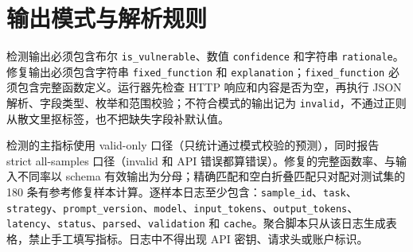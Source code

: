 \documentclass[conference]{IEEEtran}
\begin{document}
\section{输出模式与解析规则}
\label{app:schema}
检测输出必须包含布尔 \texttt{is\_vulnerable}、数值 \texttt{confidence} 和字符串 \texttt{rationale}。修复输出必须包含字符串 \texttt{fixed\_function} 和 \texttt{explanation}；\texttt{fixed\_function} 必须包含完整函数定义。运行器先检查 HTTP 响应和内容是否为空，再执行 JSON 解析、字段类型、枚举和范围校验；不符合模式的输出记为 \texttt{invalid}，不通过正则从散文里抠标签，也不把缺失字段补默认值。

检测的主指标使用 valid-only 口径（只统计通过模式校验的预测），同时报告 strict all-samples 口径（invalid 和 API 错误都算错误）。修复的完整函数率、与输入不同率以 schema 有效输出为分母；精确匹配和空白折叠匹配只对配对测试集的 180 条有参考修复样本计算。逐样本日志至少包含：\texttt{sample\_id}、\texttt{task}、\texttt{strategy}、\texttt{prompt\_version}、\texttt{model}、\texttt{input\_tokens}、\texttt{output\_tokens}、\texttt{latency}、\texttt{status}、\texttt{parsed}、\texttt{validation} 和 \texttt{cache}。聚合脚本只从该日志生成表格，禁止手工填写指标。日志中不得出现 API 密钥、请求头或账户标识。

\balance


\end{document}
